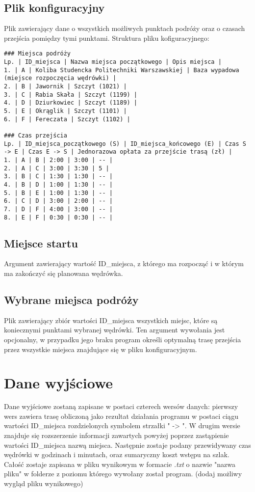 \documentclass{article}
\begin{document}
\subsection{Plik konfiguracyjny}
Plik zawierający dane o wszystkich możliwych punktach podróży oraz o czasach przejścia pomiędzy tymi punktami. Struktura pliku kofiguracyjnego:

\begin{verbatim}
### Miejsca podróży
Lp. | ID_miejsca | Nazwa miejsca początkowego | Opis miejsca |
1. | A | Koliba Studencka Politechniki Warszawskiej | Baza wypadowa (miejsce rozpoczęcia wędrówki) |
2. | B | Jawornik | Szczyt (1021) |
3. | C | Rabia Skała | Szczyt (1199) |
4. | D | Dziurkowiec | Szczyt (1189) |
5. | E | Okrąglik | Szczyt (1101) |
6. | F | Fereczata | Szczyt (1102) |

### Czas przejścia
Lp. | ID_miejsca_początkowego (S) | ID_miejsca_końcowego (E) | Czas S -> E | Czas E -> S | Jednorazowa opłata za przejście trasą (zł) |
1. | A | B | 2:00 | 3:00 | -- |
2. | A | C | 3:00 | 3:30 | 5 |
3. | B | C | 1:30 | 1:30 | -- |
4. | B | D | 1:00 | 1:30 | -- |
5. | B | E | 1:00 | 1:30 | -- |
6. | C | D | 3:00 | 2:00 | -- |
7. | D | F | 4:00 | 3:00 | -- |
8. | E | F | 0:30 | 0:30 | -- |
\end{verbatim}
\subsection{Miejsce startu}
Argument zawierający wartość ID\_miejsca, z którego ma rozpocząć i w którym ma zakończyć się planowana wędrówka.
\subsection{Wybrane miejsca podróży}
Plik zawierający zbiór wartości ID\_miejsca wszystkich miejsc, które są koniecznymi punktami wybranej wędrówki. Ten argument wywołania jest opcjonalny, w przypadku jego braku program określi optymalną trasę przejścia przez wszystkie miejsca znajdujące się w pliku konfiguracyjnym.
\section{Dane wyjściowe}
Dane wyjściowe zostaną zapisane w postaci czterech wersów danych: pierwszy wers zawiera trasę obliczoną jako rezultat działania programu w postaci ciągu wartości ID\_miejsca rozdzielonych symbolem strzałki " -> ". W drugim wersie znajduje się rozszerzenie informacji zawartych powyżej poprzez zastąpienie wartości ID\_miejsca nazwą miejsca. Następnie zostaje podany przewidywany czas wędrówki w godzinach i minutach, oraz sumaryczny koszt wstępu na szlak. Całość zostaje zapisana w pliku wynikowym w formacie \textit{.txt} o nazwie "nazwa pliku" w folderze z poziomu którego wywołany został program. 
(dodaj możliwy wygląd pliku wynikowego)
\end{document}
